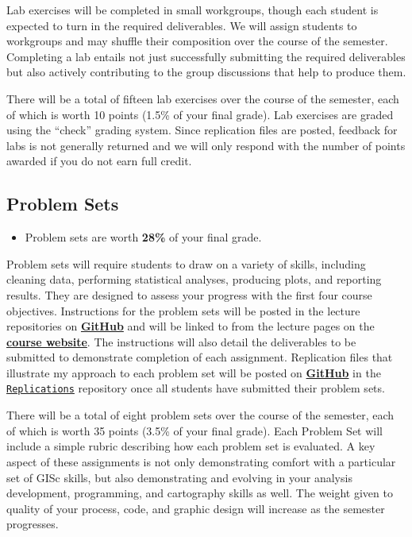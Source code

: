 \documentclass[]{book}
\newenvironment{rmdblock}[1]
  {\begin{shaded*}
  \begin{itemize}
  \renewcommand{\labelitemi}{
    \raisebox{-.7\height}[0pt][0pt]{
      {\setkeys{Gin}{width=3em,keepaspectratio}\texttt{[image: images/\#1]}}
    }
  }
  \item
  }
  {
  \end{itemize}
  \end{shaded*}
  }
\newenvironment{rmdtip}
  {\begin{rmdblock}{tip}}
  {\end{rmdblock}}
\theoremstyle{definition}
\theoremstyle{definition}
\theoremstyle{definition}
\theoremstyle{remark}
\begin{document}
Lab exercises will be completed in small workgroups, though each student
is expected to turn in the required deliverables. We will assign
students to workgroups and may shuffle their composition over the course
of the semester. Completing a lab entails not just successfully
submitting the required deliverables but also actively contributing to
the group discussions that help to produce them.

There will be a total of fifteen lab exercises over the course of the
semester, each of which is worth 10 points (1.5\% of your final grade).
Lab exercises are graded using the ``check'' grading system. Since
replication files are posted, feedback for labs is not generally
returned and we will only respond with the number of points awarded if
you do not earn full credit.

\subsection{Problem Sets}\label{problem-sets}

\begin{rmdtip}
Problem sets are worth \textbf{28\%} of your final grade.
\end{rmdtip}

Problem sets will require students to draw on a variety of skills,
including cleaning data, performing statistical analyses, producing
plots, and reporting results. They are designed to assess your progress
with the first four course objectives. Instructions for the problem sets
will be posted in the lecture repositories on
\href{https://github.com/slu-soc5050}{\textbf{GitHub}} and will be
linked to from the lecture pages on the
\href{https://slu-soc5050.github.io/}{\textbf{course website}}. The
instructions will also detail the deliverables to be submitted to
demonstrate completion of each assignment. Replication files that
illustrate my approach to each problem set will be posted on
\href{https://github.com/slu-soc5050}{\textbf{GitHub}} in the
\href{https://github.com/slu-soc5050/Replications}{\texttt{Replications}}
repository once all students have submitted their problem sets.

There will be a total of eight problem sets over the course of the
semester, each of which is worth 35 points (3.5\% of your final grade).
Each Problem Set will include a simple rubric describing how each
problem set is evaluated. A key aspect of these assignments is not only
demonstrating comfort with a particular set of GISc skills, but also
demonstrating and evolving in your analysis development, programming,
and cartography skills as well. The weight given to quality of your
process, code, and graphic design will increase as the semester
progresses.
\end{document}
